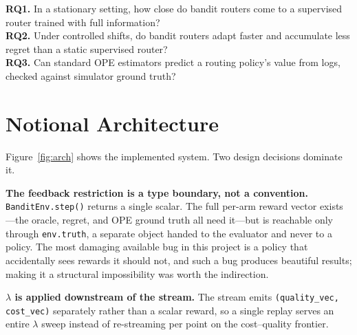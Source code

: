 \documentclass[10pt,twocolumn]{article}
\newcommand{\lam}{\lambda}
\begin{document}
\noindent\textbf{RQ1.} In a stationary setting, how close do bandit routers come
to a supervised router trained with full information?\\
\textbf{RQ2.} Under controlled shifts, do bandit routers adapt faster and
accumulate less regret than a static supervised router?\\
\textbf{RQ3.} Can standard OPE estimators predict a routing policy's value from
logs, checked against simulator ground truth?

\section{Notional Architecture}

Figure~\ref{fig:arch} shows the implemented system. Two design decisions
dominate it.

\textbf{The feedback restriction is a type boundary, not a convention.}
\texttt{BanditEnv.step()} returns a single scalar. The full per-arm reward
vector exists---the oracle, regret, and OPE ground truth all need it---but is
reachable only through \texttt{env.truth}, a separate object handed to the
evaluator and never to a policy. The most damaging available bug in this project
is a policy that accidentally sees rewards it should not, and such a bug
produces beautiful results; making it a structural impossibility was worth the
indirection.

\textbf{$\lam$ is applied downstream of the stream.} The stream emits
\texttt{(quality\_vec, cost\_vec)} separately rather than a scalar reward, so a
single replay serves an entire $\lam$ sweep instead of re-streaming per point on
the cost--quality frontier.
\end{document}
